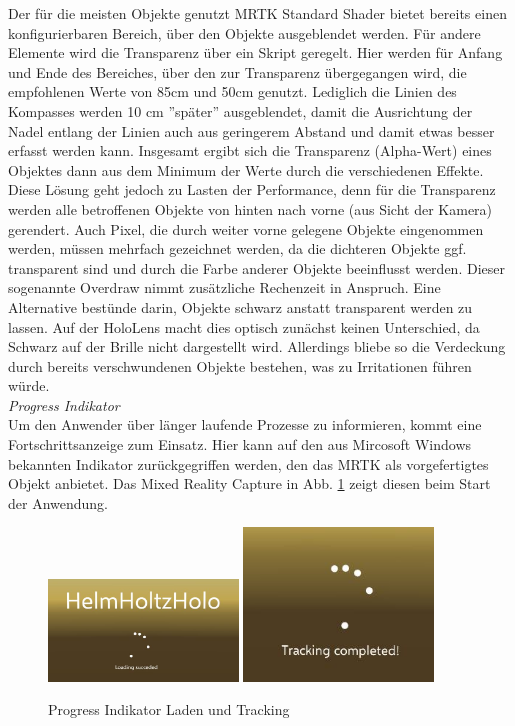 Der für die meisten Objekte genutzt MRTK Standard Shader bietet bereits einen konfigurierbaren Bereich, über den Objekte ausgeblendet werden. Für andere Elemente wird die Transparenz über ein Skript geregelt. Hier werden für Anfang und Ende des Bereiches, über den zur Transparenz übergegangen wird, die empfohlenen Werte von 85cm und 50cm genutzt. Lediglich die Linien des Kompasses werden 10 cm ''später'' ausgeblendet, damit die Ausrichtung der Nadel entlang der Linien auch aus geringerem Abstand und damit etwas besser erfasst werden kann. Insgesamt ergibt sich die Transparenz (Alpha-Wert) eines Objektes dann aus dem Minimum der Werte durch die verschiedenen Effekte.\\

Diese Lösung geht jedoch zu Lasten der Performance, denn für die Transparenz werden alle betroffenen Objekte von hinten nach vorne (aus Sicht der Kamera) gerendert. Auch Pixel, die durch weiter vorne gelegene Objekte eingenommen werden, müssen mehrfach gezeichnet werden, da die dichteren Objekte ggf. transparent sind und durch die Farbe anderer Objekte beeinflusst werden. Dieser sogenannte Overdraw nimmt zusätzliche Rechenzeit in Anspruch. Eine Alternative bestünde darin, Objekte schwarz anstatt transparent werden zu lassen. Auf der HoloLens macht dies optisch zunächst keinen Unterschied, da Schwarz auf der Brille nicht dargestellt wird. Allerdings bliebe so die Verdeckung durch bereits verschwundenen Objekte bestehen, was zu Irritationen führen würde.\\

\textit{Progress Indikator}\\
Um den Anwender über länger laufende Prozesse zu informieren, kommt eine Fortschrittsanzeige zum Einsatz. Hier kann auf den aus Mircosoft Windows bekannten Indikator zurückgegriffen werden, den das MRTK als vorgefertigtes Objekt anbietet. Das Mixed Reality Capture in Abb. \ref{img:pi-and-tracking} zeigt diesen beim Start der Anwendung.\\

\begin{figure}[H]
	\centering
	\includegraphics[width=0.45\textwidth]{images/loading.jpg}
	\hspace{0.05cm}	
	\includegraphics[width=0.45\textwidth]{images/tracking.jpg}
	\caption{Progress Indikator Laden und Tracking}
	\label{img:pi-and-tracking}
\end{figure}

